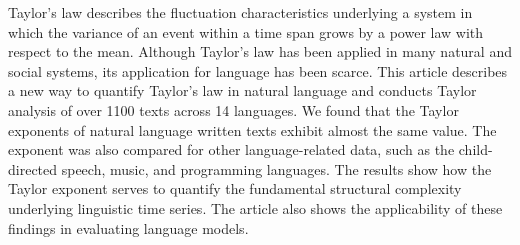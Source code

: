 Taylor's law describes the fluctuation characteristics underlying a system in which the variance of an event within a time span grows by a power law with respect to the mean. Although Taylor's law has been applied in many natural and social systems, its application for language has been scarce. This article describes a new way to quantify Taylor's law in natural language and conducts Taylor analysis of over 1100 texts across 14 languages. We found that the Taylor exponents of natural language written texts exhibit almost the same value. The exponent was also compared for other language-related data, such as the child-directed speech, music, and programming languages. The results show how the Taylor exponent serves to quantify the fundamental structural complexity underlying linguistic time series. The article also shows the applicability of these findings in evaluating language models.
